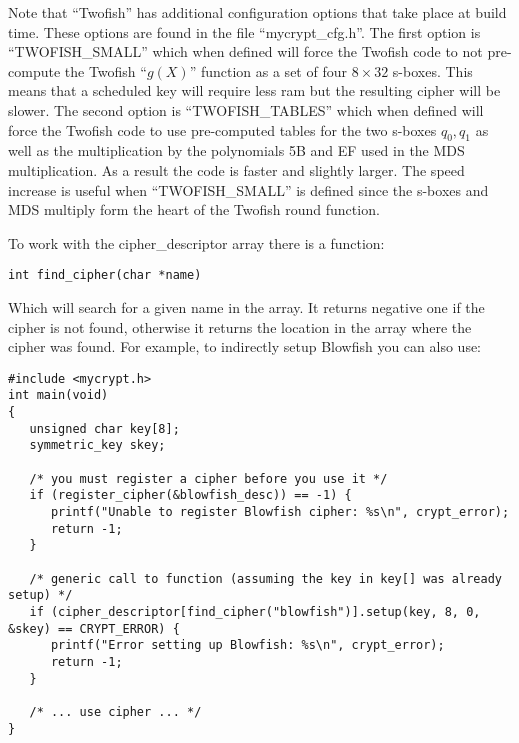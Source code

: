 \documentclass{book}
\begin{document}
Note that ``Twofish'' has additional configuration options that take place at build time.  These options are found in
the file ``mycrypt\_cfg.h''.  The first option is ``TWOFISH\_SMALL'' which when defined will force the Twofish code
to not pre-compute the Twofish ``$g(X)$'' function as a set of four $8 \times 32$ s-boxes.  This means that a scheduled
key will require less ram but the resulting cipher will be slower.  The second option is ``TWOFISH\_TABLES'' which when
defined will force the Twofish code to use pre-computed tables for the two s-boxes $q_0, q_1$ as well as the multiplication
by the polynomials 5B and EF used in the MDS multiplication.  As a result the code is faster and slightly larger.  The
speed increase is useful when ``TWOFISH\_SMALL'' is defined since the s-boxes and MDS multiply form the heart of the
Twofish round function.

To work with the cipher\_descriptor array there is a function:
\begin{verbatim}
int find_cipher(char *name)
\end{verbatim}
Which will search for a given name in the array.  It returns negative one if the cipher is not found, otherwise it returns
the location in the array where the cipher was found.  For example, to indirectly setup Blowfish you can also use:
\begin{small}
\begin{verbatim}
#include <mycrypt.h>
int main(void)
{
   unsigned char key[8];
   symmetric_key skey;

   /* you must register a cipher before you use it */
   if (register_cipher(&blowfish_desc)) == -1) {
      printf("Unable to register Blowfish cipher: %s\n", crypt_error);
      return -1;
   }

   /* generic call to function (assuming the key in key[] was already setup) */
   if (cipher_descriptor[find_cipher("blowfish")].setup(key, 8, 0, &skey) == CRYPT_ERROR) {
      printf("Error setting up Blowfish: %s\n", crypt_error);
      return -1;
   }

   /* ... use cipher ... */
}
\end{verbatim}
\end{small}
\end{document}
